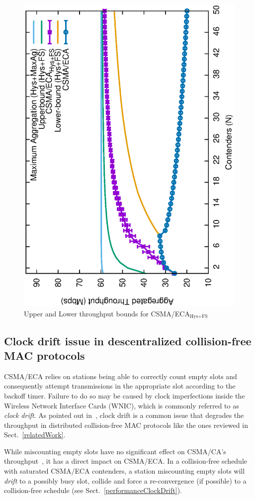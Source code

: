 	\begin{figure}[tb]
	\centering
		\includegraphics[width=0.7\linewidth,angle=-90]{figures/throughput-w-model/throughput-combined-w-model-TON.eps}
		\caption{Upper and Lower throughput bounds for CSMA/ECA$_{\text{Hys+FS}}$}
		\label{fig:ECA-bounds-comparison}
	\end{figure}
	
	\subsection{Clock drift issue in descentralized collision-free MAC protocols}\label{clockDrift-issue}
	CSMA/ECA relies on stations being able to correctly count empty slots and consequently attempt transmissions in the appropriate slot according to the backoff timer. Failure to do so may be caused by clock imperfections inside the Wireless Network Interface Cards (WNIC), which is commonly referred to as \emph{clock drift}. As pointed out in~\cite{slotDrift}, clock drift is a common issue that degrades the throughput in distributed collision-free MAC protocols like the ones reviewed in Sect.~\ref{relatedWork}.
	
	While miscounting empty slots have no significant effect on CSMA/CA's throughput~\cite{slotDrift}, it has a direct impact on CSMA/ECA. In a collision-free schedule with saturated CSMA/ECA contenders, a station miscounting empty slots will \emph{drift} to a possibly busy slot, collide and force a re-convergence (if possible) to a collision-free schedule (see Sect.~\ref{performanceClockDrift}).
	
